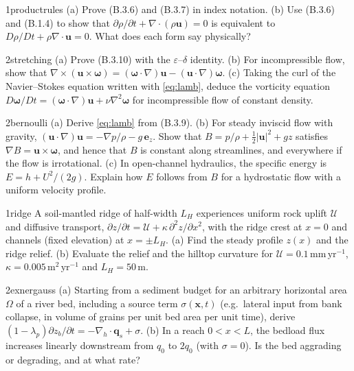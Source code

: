 \documentclass[11pt,letterpaper]{article}
\numberwithin{equation}{section}
\newcommand{\uu}{\mathbf{u}}
\newcommand{\xx}{\mathbf{x}}
\newcommand{\qq}{\mathbf{q}}
\newcommand{\e}[1]{\mathbf{e}_{#1}}
\newcommand{\bomega}{\bm{\omega}}
\newcommand{\units}[1]{\,\mathrm{#1}}
\newcommand{\Up}{\mathcal{U}}
\begin{document}
\begin{exercise}{1}{productrules}
(a) Prove (B.3.6) and (B.3.7) in index notation.
(b) Use (B.3.6) and (B.1.4) to show that $\partial\rho/\partial t+\nabla\cdot(\rho\uu)=0$ is equivalent to
$D\rho/Dt+\rho\nabla\cdot\uu=0$. What does each form say physically?
\end{exercise}

\begin{exercise}{2}{stretching}
(a) Prove (B.3.10) with the $\varepsilon$--$\delta$ identity.
(b) For incompressible flow, show that $\nabla\times(\uu\times\bomega)=(\bomega\cdot\nabla)\uu-(\uu\cdot\nabla)\bomega$.
(c) Taking the curl of the Navier--Stokes equation written with \eqref{eq:lamb}, deduce the vorticity equation
$D\bomega/Dt=(\bomega\cdot\nabla)\uu+\nu\nabla^2\bomega$ for incompressible flow of constant density.
\end{exercise}

\begin{exercise}{2}{bernoulli}
(a) Derive \eqref{eq:lamb} from (B.3.9).
(b) For steady inviscid flow with gravity, $(\uu\cdot\nabla)\uu=-\nabla p/\rho-g\,\e{z}$. Show that
$B=p/\rho+\tfrac12|\uu|^2+gz$ satisfies $\nabla B=\uu\times\bomega$, and hence that $B$ is constant along streamlines, and
everywhere if the flow is irrotational.
(c) In open-channel hydraulics, the specific energy is $E=h+U^2/(2g)$. Explain how $E$ follows from $B$ for a hydrostatic
flow with a uniform velocity profile.
\end{exercise}

\begin{exercise}{1}{ridge}
A soil-mantled ridge of half-width $L_H$ experiences uniform rock uplift $\Up$ and diffusive transport,
$\partial z/\partial t=\Up+\kappa\,\partial^2z/\partial x^2$, with the ridge crest at $x=0$ and channels (fixed elevation) at
$x=\pm L_H$.
(a) Find the steady profile $z(x)$ and the ridge relief.
(b) Evaluate the relief and the hilltop curvature for $\Up=0.1\units{mm\,yr^{-1}}$, $\kappa=0.005\units{m^2\,yr^{-1}}$ and
$L_H=50\units{m}$.
\end{exercise}

\begin{exercise}{2}{exnergauss}
(a) Starting from a sediment budget for an arbitrary horizontal area $\Omega$ of a river bed, including a source term
$\sigma(\xx,t)$ (e.g.\ lateral input from bank collapse, in volume of grains per unit bed area per unit time), derive
$(1-\lambda_p)\partial z_b/\partial t=-\nabla_h\cdot\qq_s+\sigma$.
(b) In a reach $0<x<L$, the bedload flux increases linearly downstream from $q_0$ to $2q_0$ (with $\sigma=0$). Is the bed
aggrading or degrading, and at what rate?
\end{exercise}
\end{document}

